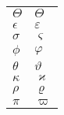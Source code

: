 \documentclass{standalone}
\begin{document}
\begin{tabular}{ll}
$\Theta$ & $\varTheta$ \\
$\epsilon$ & $\varepsilon$ \\
$\sigma$ & $\varsigma$ \\
$\phi$ & $\varphi$ \\
$\theta$ & $\vartheta$ \\
$\kappa$ & $\varkappa$ \\
$\rho$ & $\varrho$ \\
$\pi$ & $\varpi$ \\
\end{tabular}
\end{document}
